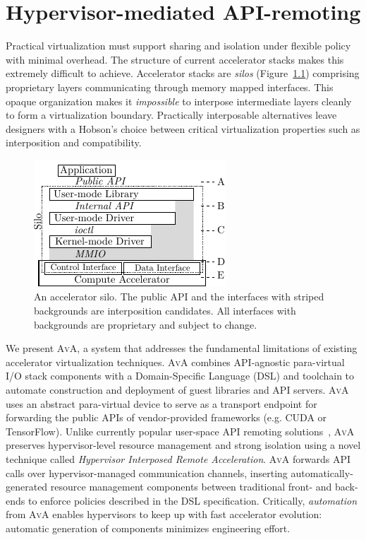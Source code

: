 \chapter{Hypervisor-mediated API-remoting}
\label{sec:ava}

Practical virtualization must support sharing and isolation under flexible
policy with minimal overhead. The structure of current accelerator stacks
makes this extremely difficult to achieve.
Accelerator stacks are \emph{silos} (Figure~\ref{fig:silo})
comprising proprietary layers communicating through memory mapped interfaces.
This opaque organization makes it \emph{impossible} to interpose intermediate
layers cleanly to form a virtualization boundary. Practically interposable
alternatives leave designers with a Hobson's choice between critical
virtualization properties such as interposition and compatibility.

\begin{figure}[!ht]
	\centering
	\includegraphics[width=.4\linewidth]{figures/silo.pdf}
	\caption{An accelerator silo.
		The public API and the interfaces with striped backgrounds are interposition candidates.
		All interfaces with backgrounds are proprietary and subject to change.
        }
	\label{fig:silo}
\end{figure}

We present \textsc{AvA}, a system that addresses the fundamental limitations
of existing accelerator virtualization techniques.
\textsc{AvA} combines API-agnostic para-virtual I/O stack components with a
Domain-Specific Language (DSL) and toolchain to automate construction
and deployment of guest libraries and API servers.
\textsc{AvA} uses an abstract para-virtual device to serve as a transport
endpoint for forwarding the public APIs of vendor-provided frameworks (e.g.
CUDA or TensorFlow). Unlike currently popular user-space API remoting
solutions~\cite{bitfusion,xaas,vmCUDA,rCUDA,cu2rcu}, \textsc{AvA} preserves
hypervisor-level resource management and strong isolation using a novel
technique called \emph{{{H}ypervisor {I}nterposed {R}emote {A}cceleration}}.
\textsc{AvA} forwards API calls over hypervisor-managed communication channels,
inserting automatically-generated resource management components between
traditional front- and back-ends
to enforce policies described in the DSL specification.
Critically, \emph{automation} from \textsc{AvA} enables hypervisors to keep up
with fast accelerator evolution: automatic generation of components minimizes
engineering effort.

